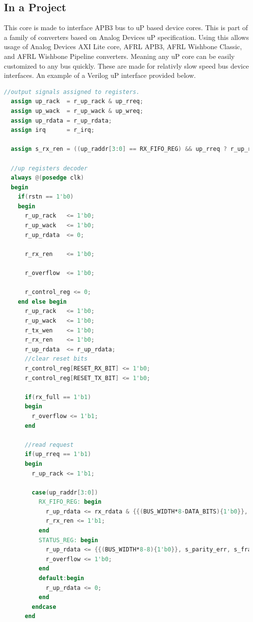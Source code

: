 

\subsection{In a Project}
\par
This core is made to interface APB3 bus to uP based device cores. This is part of a family of converters based on Analog Devices uP specification. Using this allows usage of Analog Devices AXI Lite core, AFRL APB3, AFRL Wishbone Classic, and AFRL Wishbone Pipeline converters. Meaning any uP core can be easily customized to any bus quickly. These are made for relativly slow speed bus device interfaces. An example of a Verilog uP interface provided below.

\begin{lstlisting}[language=Verilog]
  //output signals assigned to registers.
  assign up_rack  = r_up_rack & up_rreq;
  assign up_wack  = r_up_wack & up_wreq;
  assign up_rdata = r_up_rdata;
  assign irq      = r_irq;

  assign s_rx_ren = ((up_raddr[3:0] == RX_FIFO_REG) && up_rreq ? r_up_rack & r_rx_ren : 0);

  //up registers decoder
  always @(posedge clk)
  begin
    if(rstn == 1'b0)
    begin
      r_up_rack   <= 1'b0;
      r_up_wack   <= 1'b0;
      r_up_rdata  <= 0;

      r_rx_ren    <= 1'b0;

      r_overflow  <= 1'b0;

      r_control_reg <= 0;
    end else begin
      r_up_rack   <= 1'b0;
      r_up_wack   <= 1'b0;
      r_tx_wen    <= 1'b0;
      r_rx_ren    <= 1'b0;
      r_up_rdata  <= r_up_rdata;
      //clear reset bits
      r_control_reg[RESET_RX_BIT] <= 1'b0;
      r_control_reg[RESET_TX_BIT] <= 1'b0;

      if(rx_full == 1'b1)
      begin
        r_overflow <= 1'b1;
      end

      //read request
      if(up_rreq == 1'b1)
      begin
        r_up_rack <= 1'b1;

        case(up_raddr[3:0])
          RX_FIFO_REG: begin
            r_up_rdata <= rx_rdata & {{(BUS_WIDTH*8-DATA_BITS){1'b0}}, {DATA_BITS{1'b1}}};
            r_rx_ren <= 1'b1;
          end
          STATUS_REG: begin
            r_up_rdata <= {{(BUS_WIDTH*8-8){1'b0}}, s_parity_err, s_frame_err, r_overflow, r_irq_en, tx_full, tx_empty, rx_full, rx_valid};
            r_overflow <= 1'b0;
          end
          default:begin
            r_up_rdata <= 0;
          end
        endcase
      end


\end{lstlisting}
